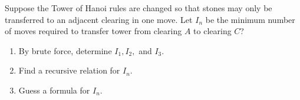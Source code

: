 \begin{prob}
Suppose the Tower of Hanoi rules are changed so that stones may only be transferred to an adjacent clearing in one move. Let $I_n$ be the minimum number of moves 
required to transfer tower from clearing $A$ to clearing $C$?
\begin{enumerate}[label=(\alph*)]
 \item By brute force, determine $I_1, I_2,$ and $I_3$. 
 \item Find a recursive relation for $I_n$.
 \item Guess a formula for $I_n$.
\end{enumerate} 
\end{prob}
%
%
%
%


